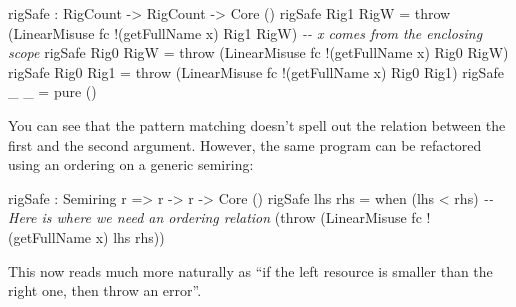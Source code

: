 \documentclass[
]{article}
\newenvironment{Shaded}{}{}
\newcommand{\CommentTok}[1]{\textcolor[rgb]{0.38,0.63,0.69}{\textit{#1}}}
\newcommand{\DataTypeTok}[1]{\textcolor[rgb]{0.56,0.13,0.00}{#1}}
\newcommand{\FunctionTok}[1]{\textcolor[rgb]{0.02,0.16,0.49}{#1}}
\newcommand{\NormalTok}[1]{#1}
\newcommand{\OperatorTok}[1]{\textcolor[rgb]{0.40,0.40,0.40}{#1}}
\newcommand{\OtherTok}[1]{\textcolor[rgb]{0.00,0.44,0.13}{#1}}
\begin{document}
\begin{Shaded}
\begin{Highlighting}[]

\NormalTok{rigSafe }\OperatorTok{:} \DataTypeTok{RigCount} \OtherTok{{-}\textgreater{}} \DataTypeTok{RigCount} \OtherTok{{-}\textgreater{}} \DataTypeTok{Core}\NormalTok{ ()}
\NormalTok{  rigSafe }\DataTypeTok{Rig1} \DataTypeTok{RigW} \OtherTok{=}\NormalTok{ throw }
\NormalTok{    (}\DataTypeTok{LinearMisuse}\NormalTok{ fc }\OperatorTok{!}\NormalTok{(getFullName x) }\DataTypeTok{Rig1} \DataTypeTok{RigW}\NormalTok{)}
    \CommentTok{{-}{-} \textasciigrave{}x\textasciigrave{} comes from the enclosing scope}
\NormalTok{rigSafe }\DataTypeTok{Rig0} \DataTypeTok{RigW} \OtherTok{=}\NormalTok{ throw}
\NormalTok{    (}\DataTypeTok{LinearMisuse}\NormalTok{ fc }\OperatorTok{!}\NormalTok{(getFullName x) }\DataTypeTok{Rig0} \DataTypeTok{RigW}\NormalTok{)}
\NormalTok{rigSafe }\DataTypeTok{Rig0} \DataTypeTok{Rig1} \OtherTok{=}\NormalTok{ throw }
\NormalTok{    (}\DataTypeTok{LinearMisuse}\NormalTok{ fc }\OperatorTok{!}\NormalTok{(getFullName x) }\DataTypeTok{Rig0} \DataTypeTok{Rig1}\NormalTok{)}
\NormalTok{rigSafe \_ \_ }\OtherTok{=} \FunctionTok{pure}\NormalTok{ ()}
\end{Highlighting}
\end{Shaded}

You can see that the pattern matching doesn't spell out the relation
between the first and the second argument. However, the same program can
be refactored using an ordering on a generic semiring:

\begin{Shaded}
\begin{Highlighting}[]
\NormalTok{rigSafe }\OperatorTok{:} \DataTypeTok{Semiring}\NormalTok{ r }\OtherTok{=\textgreater{}}\NormalTok{ r }\OtherTok{{-}\textgreater{}}\NormalTok{ r }\OtherTok{{-}\textgreater{}} \DataTypeTok{Core}\NormalTok{ ()}
\NormalTok{rigSafe lhs rhs }\OtherTok{=} 
\NormalTok{  when (lhs }\OperatorTok{\textless{}}\NormalTok{ rhs) }\CommentTok{{-}{-} Here is where we need an ordering relation}
\NormalTok{       (throw (}\DataTypeTok{LinearMisuse}\NormalTok{ fc }\OperatorTok{!}\NormalTok{(getFullName x) lhs rhs))}
\end{Highlighting}
\end{Shaded}

This now reads much more naturally as ``if the left resource is smaller
than the right one, then throw an error''.
\end{document}

